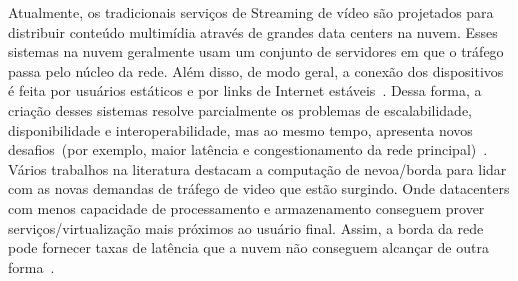 Atualmente, os tradicionais serviços de Streaming de vídeo são projetados para distribuir conteúdo multimídia através de grandes data centers na nuvem. Esses sistemas na nuvem geralmente usam um conjunto de servidores em que o tráfego passa pelo núcleo da rede. Além disso, de modo geral, a conexão dos dispositivos é feita por usuários estáticos e por links de Internet estáveis~\cite{sitaraman:ACD2014}. Dessa forma, a criação desses sistemas resolve parcialmente os problemas de escalabilidade, disponibilidade e interoperabilidade, mas ao mesmo tempo, apresenta novos desafios~(por exemplo, maior latência e congestionamento da rede principal)~\cite{tran:wons17,ye:ITC17,taleb:JSAC18}. Vários trabalhos na literatura destacam a computação de nevoa/borda para lidar com as novas demandas de tráfego de video que estão surgindo. Onde datacenters com menos capacidade de processamento e armazenamento conseguem prover serviços/virtualização mais próximos ao usuário final. Assim, a borda da rede pode fornecer taxas de latência que a nuvem não conseguem alcançar de outra forma~\cite{gamaUCC2019, rosarioSENSORS2018}.



